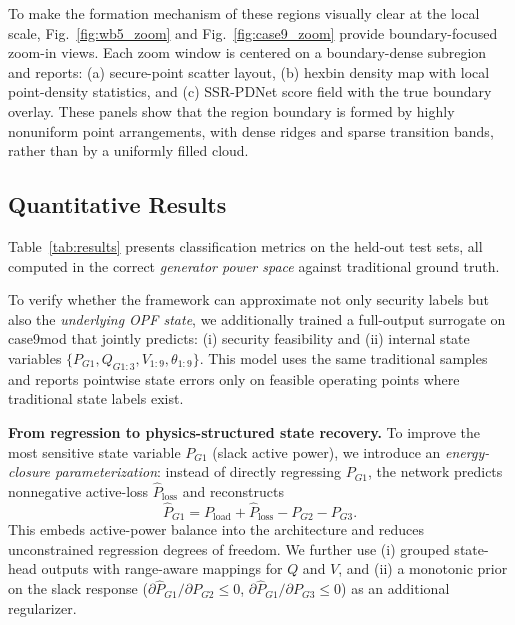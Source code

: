 \documentclass[journal]{IEEEtran}
\begin{document}
To make the formation mechanism of these regions visually clear at the local scale,
Fig.~\ref{fig:wb5_zoom} and Fig.~\ref{fig:case9_zoom} provide boundary-focused
zoom-in views. Each zoom window is centered on a boundary-dense subregion and
reports: (a) secure-point scatter layout, (b) hexbin density map with local
point-density statistics, and (c) SSR-PDNet score field with the true boundary
overlay. These panels show that the region boundary is formed by highly
nonuniform point arrangements, with dense ridges and sparse transition bands,
rather than by a uniformly filled cloud.

\FloatBarrier

\subsection{Quantitative Results}

Table~\ref{tab:results} presents classification metrics on the held-out test sets,
all computed in the correct \emph{generator power space} against traditional ground truth.

To verify whether the framework can approximate not only security labels but
also the \emph{underlying OPF state}, we additionally trained a full-output
surrogate on case9mod that jointly predicts: (i) security feasibility and
(ii) internal state variables
$\{P_{G1},Q_{G1:3},V_{1:9},\theta_{1:9}\}$. This model uses the same
traditional samples and reports pointwise state errors only on feasible
operating points where traditional state labels exist.

\textbf{From regression to physics-structured state recovery.}
To improve the most sensitive state variable $P_{G1}$ (slack active power), we
introduce an \emph{energy-closure parameterization}: instead of directly
regressing $P_{G1}$, the network predicts nonnegative active-loss
$\hat{P}_{\mathrm{loss}}$ and reconstructs
\begin{equation}
\hat{P}_{G1} = P_{\mathrm{load}} + \hat{P}_{\mathrm{loss}} - P_{G2} - P_{G3}.
\label{eq:energy_closure}
\end{equation}
This embeds active-power balance into the architecture and reduces unconstrained
regression degrees of freedom. We further use (i) grouped state-head outputs
with range-aware mappings for $Q$ and $V$, and (ii) a monotonic prior on the
slack response ($\partial \hat{P}_{G1}/\partial P_{G2} \le 0$,
$\partial \hat{P}_{G1}/\partial P_{G3} \le 0$) as an additional regularizer.
\end{document}
